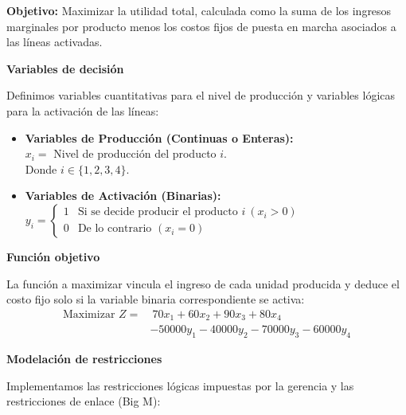 \documentclass[10pt,a4paper]{article}
\begin{document}
\textbf{Objetivo:} Maximizar la utilidad total, calculada como la suma de los ingresos marginales por producto menos los costos fijos de puesta en marcha asociados a las líneas activadas.

\vspace{3mm}
\textbf{Variables de decisión}

Definimos variables cuantitativas para el nivel de producción y variables lógicas para la activación de las líneas:
\begin{itemize}
    \item \textbf{Variables de Producción (Continuas o Enteras):} \\
    $x_i = $ Nivel de producción del producto $i$. \\
    Donde $i \in \{1, 2, 3, 4\}$.
    
    \item \textbf{Variables de Activación (Binarias):} \\
    $y_i = 
    \begin{cases} 
    1 & \text{Si se decide producir el producto } i \ (x_i > 0) \\
    0 & \text{De lo contrario } (x_i = 0)
    \end{cases}$
\end{itemize}

\vspace{3mm}
\textbf{Función objetivo}

La función a maximizar vincula el ingreso de cada unidad producida y deduce el costo fijo solo si la variable binaria correspondiente se activa:
\begin{align*}
\text{Maximizar } Z = & \ 70x_1 + 60x_2 + 90x_3 + 80x_4 \\
                      & - 50000y_1 - 40000y_2 - 70000y_3 - 60000y_4
\end{align*}

\vspace{3mm}
\textbf{Modelación de restricciones}

Implementamos las restricciones lógicas impuestas por la gerencia y las restricciones de enlace (Big M):
\end{document}
